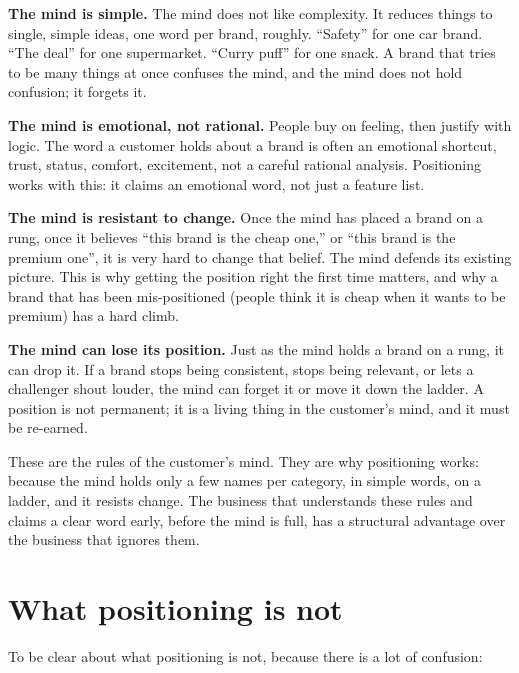 \documentclass[10pt,twoside,openany]{memoir}
\newcommand{\needspacehead}{\needspace{4\baselineskip}}
\let\oldsection\section
\renewcommand{\section}{\needspacehead\oldsection}
\begin{document}
\textbf{The mind is simple.} The mind does not like complexity. It
reduces things to single, simple ideas, one word per brand, roughly.
``Safety'' for one car brand. ``The deal'' for one supermarket. ``Curry
puff'' for one snack. A brand that tries to be many things at once
confuses the mind, and the mind does not hold confusion; it forgets it.

\textbf{The mind is emotional, not rational.} People buy on feeling,
then justify with logic. The word a customer holds about a brand is
often an emotional shortcut, trust, status, comfort, excitement, not a
careful rational analysis. Positioning works with this: it claims an
emotional word, not just a feature list.

\textbf{The mind is resistant to change.} Once the mind has placed a
brand on a rung, once it believes ``this brand is the cheap one,'' or
``this brand is the premium one'', it is very hard to change that
belief. The mind defends its existing picture. This is why getting the
position right the first time matters, and why a brand that has been
mis-positioned (people think it is cheap when it wants to be premium)
has a hard climb.

\textbf{The mind can lose its position.} Just as the mind holds a brand
on a rung, it can drop it. If a brand stops being consistent, stops
being relevant, or lets a challenger shout louder, the mind can forget
it or move it down the ladder. A position is not permanent; it is a
living thing in the customer's mind, and it must be re-earned.

These are the rules of the customer's mind. They are why positioning
works: because the mind holds only a few names per category, in simple
words, on a ladder, and it resists change. The business that understands
these rules and claims a clear word early, before the mind is full, has
a structural advantage over the business that ignores them.

\section{What positioning is not}\label{what-positioning-is-not}

To be clear about what positioning is not, because there is a lot of
confusion:
\end{document}
